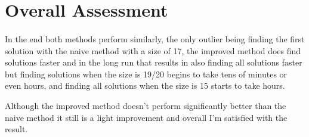 \documentclass[runningheads]{llncs}
\begin{document}
\section{Overall Assessment}
\paragraph{}

In the end both methods perform similarly, the only outlier being finding the first solution with the naive method with a size of 17, the improved method does find solutions faster and in the long run that results in also finding all solutions faster but finding solutions when the size is 19/20 begins to take tens of minutes or even hours, and finding all solutions when the size is 15 starts to take hours.

Although the improved method doesn't perform significantly better than the naive method it still is a light improvement and overall I'm satisfied with the result.


\printbibliography
\end{document}
